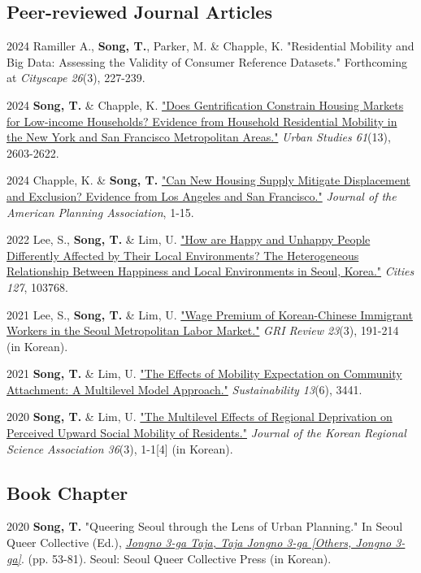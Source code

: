 \documentclass[12pt,letterpaper]{report}
\begin{document}
    \subsection*{Peer-reviewed Journal Articles}
    \begin{tablist}
        \item[2024] \tab{}Ramiller A., \textbf{Song, T.}, Parker, M. \& Chapple, K. "Residential Mobility and Big Data: Assessing the Validity of Consumer Reference Datasets." Forthcoming at \emph{Cityscape 26}(3), 227-239.
        \item[2024] \tab{}\textbf{Song, T.} \& Chapple, K. \href{https://doi.org/10.1177/00420980241244699}{"Does Gentrification Constrain Housing Markets for Low-income Households? Evidence from Household Residential Mobility in the New York and San Francisco Metropolitan Areas."} \emph{Urban Studies 61}(13), 2603-2622.
        \item[2024] \tab{}Chapple, K. \& \textbf{Song, T.} \href{https://doi.org/10.1080/01944363.2024.2319293}{"Can New Housing Supply Mitigate Displacement and Exclusion? Evidence from Los Angeles and San Francisco."} \emph{Journal of the American Planning Association}, 1-15.
        \item[2022] \tab{}Lee, S., \textbf{Song, T.} \& Lim, U. \href{https://doi.org/10.1016/j.cities.2022.103768}{"How are Happy and Unhappy People Differently Affected by Their Local Environments? The Heterogeneous Relationship Between Happiness and Local Environments in Seoul, Korea."} \emph{Cities 127}, 103768.
        \item[2021] \tab{}Lee, S., \textbf{Song, T.} \& Lim, U. \href{https://www.dbpia.co.kr/Journal/articleDetail?nodeId=NODE11025769}{"Wage Premium of Korean-Chinese Immigrant Workers in the Seoul Metropolitan Labor Market."} \emph{GRI Review 23}(3), 191-214 (in Korean).
        \item[2021] \tab{}\textbf{Song, T.} \& Lim, U. \href{https://www.mdpi.com/2071-1050/13/6/3441}{"The Effects of Mobility Expectation on Community Attachment: A Multilevel Model Approach."} \emph{Sustainability 13}(6), 3441.
        \item[2020] \tab{}\textbf{Song, T.} \& Lim, U. \href{"https://www.koreascience.or.kr/article/JAKO202030161655441.page}{"The Multilevel Effects of Regional Deprivation on Perceived Upward Social Mobility of Residents."} \emph{Journal of the Korean Regional Science Association 36}(3), 1-1[4] (in Korean).
    \end{tablist}
    \subsection*{Book Chapter}
    \begin{tablist}
        \item[2020] \tab{}\textbf{Song, T.} "Queering Seoul through the Lens of Urban Planning." In Seoul Queer Collective (Ed.), \emph{\href{http://www.kyobobook.co.kr/product/detailViewKor.laf?ejkGb=KOR&mallGb=KOR&barcode=9791197096501}{Jongno 3-ga Taja, Taja Jongno 3-ga [Others, Jongno 3-ga]}}. (pp. 53-81). Seoul: Seoul Queer Collective Press (in Korean).
    \end{tablist}
\end{document}
